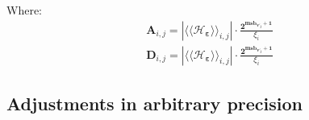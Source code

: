 		Where:
		\begin{eqnarray}
			\boldsymbol{A}_{i,j}= | \langle\langle \mathcal{H}_{\boldsymbol{\varepsilon}} \rangle\rangle_{i,j} | \cdot \frac{\boldsymbol{2^{msb_{v'_j}+1}}}{\xi_i} \\
			\boldsymbol{D}_{i,j}= | \langle\langle \mathcal{H}_{\boldsymbol{\varepsilon}} \rangle\rangle_{i,j}| \cdot \frac{\boldsymbol{2^{msb_{v'_j}+1}}}{\xi_i}
		\end{eqnarray}










	\subsection{Adjustments in arbitrary precision}

	





%		
%		
%
%	
%
%



	



